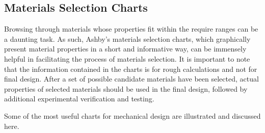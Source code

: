 \documentclass[a4paper,openany,12pt]{book}
\begin{document}
\subsection{Materials Selection Charts}
\label{sec:orgc316239}
Browsing through materials whose properties fit within the require
ranges can be a daunting task. As such, Ashby's materials selection
charts, which graphically present material properties in a short and
informative way, can be immensely helpful in facilitating the process of
materials selection. It is important to note that the information
contained in the charts is for rough calculations and not for final
design. After a set of possible candidate materials have been selected,
actual properties of selected materials should be used in the final
design, followed by additional experimental verification and testing.

Some of the most useful charts for mechanical design are illustrated and
discussed here.
\end{document}
